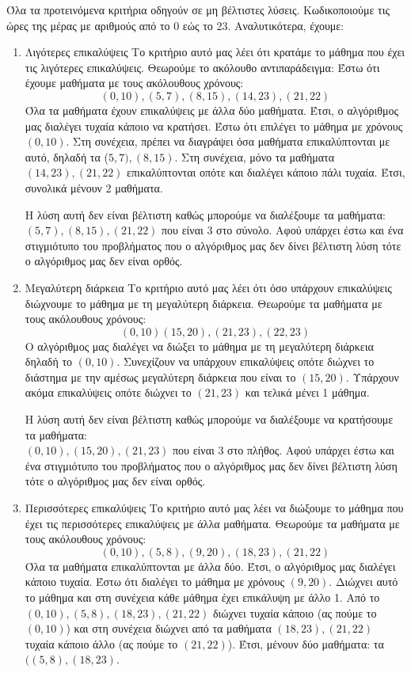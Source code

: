 \documentclass[a4paper,oneside, 11pt]{article}
\begin{document}
Όλα τα προτεινόμενα κριτήρια οδηγούν σε μη βέλτιστες λύσεις. Κωδικοποιούμε τις ώρες της μέρας με αριθμούς από το 0 εώς το 23. Αναλυτικότερα, έχουμε:
\begin{enumerate}
	\item Λιγότερες επικαλύψεις \bigbreak
	Το κριτήριο αυτό μας λέει ότι κρατάμε το μάθημα που έχει τις λιγότερες επικαλύψεις. Θεωρούμε το ακόλουθο αντιπαράδειγμα:
	\bigbreak
	Έστω ότι έχουμε μαθήματα με τους ακόλουθους χρόνους:
	$$(0,10), (5,7), (8, 15), (14, 23), (21,22)$$
	Όλα τα μαθήματα έχουν επικαλύψεις με άλλα δύο μαθήματα. Έτσι, ο αλγόριθμος μας διαλέγει τυχαία κάποιο να κρατήσει. Έστω ότι επιλέγει το μάθημα με χρόνους $(0,10)$. Στη συνέχεια, πρέπει να διαγράψει όσα μαθήματα επικαλύπτονται με αυτό, δηλαδή τα ($5,7), (8,15)$. Στη συνέχεια, μόνο τα μαθήματα $(14,23), (21,22)$ επικαλύπτονται οπότε και διαλέγει κάποιο πάλι τυχαία. Έτσι, συνολικά μένουν 2 μαθήματα. \bigbreak 
	
	Η λύση αυτή δεν είναι βέλτιστη καθώς μπορούμε να διαλέξουμε τα μαθήματα: $(5,7), (8,15), (21,22)$ που είναι 3 στο σύνολο. Αφού υπάρχει έστω και ένα στιγμιότυπο του προβλήματος που ο αλγόριθμος μας δεν δίνει βέλτιστη λύση τότε ο αλγόριθμος μας δεν είναι ορθός.
	
	\item Μεγαλύτερη διάρκεια \bigbreak 
	Το κριτήριο αυτό μας λέει ότι όσο υπάρχουν επικαλύψεις διώχνουμε το μάθημα με τη μεγαλύτερη διάρκεια. \bigbreak 
	Θεωρούμε τα μαθήματα με τους ακόλουθους χρόνους:
	$$(0,10) (15,20), (21, 23), (22, 23)$$
	Ο αλγόριθμος μας διαλέγει να διώξει το μάθημα με τη μεγαλύτερη διάρκεια δηλαδή το $(0,10)$. Συνεχίζουν να υπάρχουν επικαλύψεις οπότε διώχνει το διάστημα με την αμέσως μεγαλύτερη διάρκεια που είναι το $(15,20)$. Υπάρχουν ακόμα επικαλύψεις οπότε διώχνει το $(21,23)$ και τελικά μένει 1 μάθημα. 
	
	Η λύση αυτή δεν είναι βέλτιστη καθώς μπορούμε να διαλέξουμε να κρατήσουμε τα μαθήματα: \\ $(0,10), (15,20), (21,23)$ που είναι 3 στο πλήθος. Αφού υπάρχει έστω και ένα στιγμιότυπο του προβλήματος που ο αλγόριθμος μας δεν δίνει βέλτιστη λύση τότε ο αλγόριθμος μας δεν είναι ορθός.
	
	\item Περισσότερες επικαλύψεις \bigbreak 
	Το κριτήριο αυτό μας λέει να διώξουμε το μάθημα που έχει τις περισσότερες επικαλύψεις με άλλα μαθήματα. \bigbreak 
	Θεωρούμε τα μαθήματα με τους ακόλουθους χρόνους:
	$$(0,10), (5,8), (9, 20), (18, 23), (21, 22)$$
	Όλα τα μαθήματα επικαλύπτονται με άλλα δύο. Έτσι, ο αλγόριθμος μας διαλέγει κάποιο τυχαία. Έστω ότι διαλέγει το μάθημα με χρόνους $(9, 20)$. Διώχνει αυτό το μάθημα και στη συνέχεια κάθε μάθημα έχει επικάλυψη με άλλο 1. Από το $(0,10), (5,8), (18,23), (21,22)$ διώχνει τυχαία κάποιο (ας πούμε το $(0,10)$) και στη συνέχεια διώχνει από τα μαθήματα $(18,23), (21,22)$ τυχαία κάποιο άλλο (ας πούμε το $(21,22)$). Έτσι, μένουν δύο μαθήματα: τα $((5,8),(18,23)$. 
	

\end{enumerate}
\end{document}
